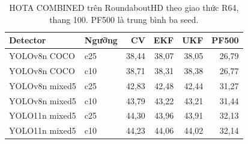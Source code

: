 \begin{table}[htbp]\centering\small
\caption{HOTA COMBINED trên RoundaboutHD theo giao thức R64, thang 100. PF500 là trung bình ba seed.}\label{tab:ngoai-round}
\begin{tabular}{llrrrr}\hline
Detector & Ngưỡng & CV & EKF & UKF & PF500\\\hline
YOLOv8n COCO & c25 & 38,44 & 38,07 & 38,05 & 26,79\\
YOLOv8n COCO & c10 & 38,71 & 38,31 & 38,38 & 26,77\\
YOLOv8n mixed5 & c25 & 42,83 & 42,48 & 42,44 & 31,27\\
YOLOv8n mixed5 & c10 & 43,79 & 43,22 & 43,21 & 31,44\\
YOLO11n mixed5 & c25 & 44,30 & 43,96 & 43,91 & 32,13\\
YOLO11n mixed5 & c10 & 44,23 & 44,06 & 44,02 & 32,14\\
\hline\end{tabular}\end{table}
